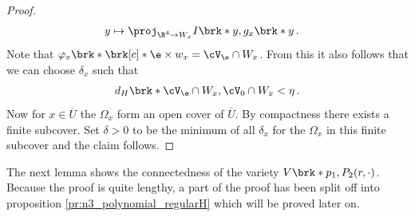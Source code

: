 \begin{proof}
\begin{align*}
    y&\mapsto \proj_{\R^4\to W_x}I\brk*{y,g_x\brk*{y}}\,.
  \end{align*}
  Note that $\varphi_x\brk*{\brk[c]*{\e}\times w_x}=\cV_\e\cap W_x$.
  From this it also follows that we can choose $\delta_x$
  such that
  \begin{align*}
    d_H\brk*{\cV_\e\cap W_x,\cV_0\cap W_x}<\eta\,.
  \end{align*}
  Now for $x\in\overline{U}$ the $\Omega_x$ form an open cover of $\overline{U}$.
  By compactness there exists a finite subcover.
  Set $\delta>0$ to be the minimum of all 
  $\delta_x$ for the $\Omega_x$ in this finite subcover and the claim follows.
\end{proof}

The next lemma shows the connectedness of the variety $V\brk*{p_1,P_2(r,\cdot)}$.
Because the proof is quite lengthy, a part of the proof has been split off into
proposition \ref{pr:n3_polynomial_regularH} which will be proved later on.
%   

